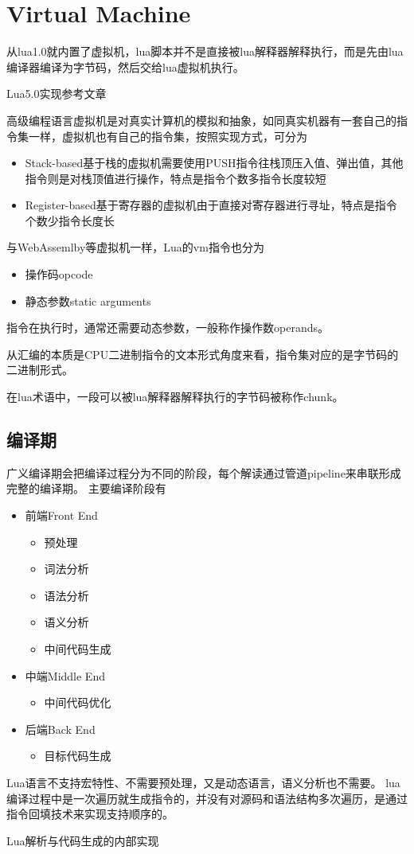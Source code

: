 \chapter{Virtual Machine}

从lua1.0就内置了虚拟机，lua脚本并不是直接被lua解释器解释执行，而是先由lua编译器编译为字节码，然后交给lua虚拟机执行。

Lua5.0\cite{tiollua5}实现参考文章

高级编程语言虚拟机是对真实计算机的模拟和抽象，如同真实机器有一套自己的指令集一样，虚拟机也有自己的指令集，按照实现方式，可分为
\begin{itemize}
    \item {Stack-based基于栈的虚拟机需要使用PUSH指令往栈顶压入值、弹出值，其他指令则是对栈顶值进行操作，特点是指令个数多指令长度较短}
    \item {Register-based基于寄存器的虚拟机由于直接对寄存器进行寻址，特点是指令个数少指令长度长}
\end{itemize}

与WebAssemlby等虚拟机一样，Lua的vm指令也分为
\begin{itemize}
    \item {操作码opcode}
    \item {静态参数static arguments}
\end{itemize}

指令在执行时，通常还需要动态参数，一般称作操作数operands。

从汇编的本质是CPU二进制指令的文本形式角度来看，指令集对应的是字节码的二进制形式。

在lua术语中，一段可以被lua解释器解释执行的字节码被称作chunk。

\section{编译期}

广义编译期会把编译过程分为不同的阶段，每个解读通过管道pipeline来串联形成完整的编译期。
主要编译阶段有
\begin{itemize}
    \item {前端Front End}
    \begin{itemize}
        \item {预处理}
        \item {词法分析}
        \item {语法分析}
        \item {语义分析}
        \item {中间代码生成}
    \end{itemize}
    \item {中端Middle End}
    \begin{itemize}
        \item {中间代码优化}
    \end{itemize}
    \item {后端Back End}
    \begin{itemize}
        \item {目标代码生成}
    \end{itemize}
\end{itemize}

Lua语言不支持宏特性、不需要预处理，又是动态语言，语义分析也不需要。
lua编译过程中是一次遍历就生成指令的，并没有对源码和语法结构多次遍历，是通过指令回填技术来实现支持顺序的。

Lua解析与代码生成的内部实现\cite{parsingAndCodeGeneration}